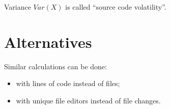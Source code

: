\documentclass[12pt]{article}
\begin{document}
    \immediate{}
    

    Variance $Var(X)$ is called ``source code volatility''.

\section{Alternatives}

    Similar calculations can be done:

    \begin{itemize}
        \item with lines of code instead of files;
        \item with unique file editors instead of file changes.
    \end{itemize}
\end{document}
